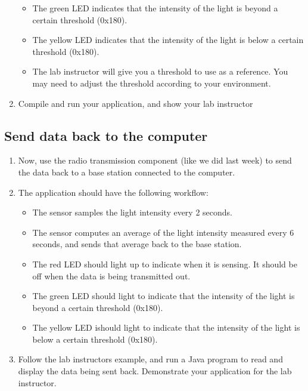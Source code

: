 \documentclass[letterpaper,12pt]{article}
\begin{document}
\begin{enumerate}
\begin{itemize}
            \item The green LED indicates that the intensity of the light
                  is beyond a certain threshold (0x180).
            \item The yellow LED indicates that the intensity of the light is
                  below a certain threshold (0x180).
            \item The lab instructor will give you a threshold to use as a
                  reference. You may need to adjust the threshold according
                  to your environment.
          \end{itemize}
    \item Compile and run your application, and show your lab instructor
\end{enumerate}
\subsection*{Send data back to the computer}
\begin{enumerate}
    \item Now, use the radio transmission component (like we did last week) to
          send the data back to a base station connected to the computer.
    \item The application should have the following workflow:
        \begin{itemize}
            \item The sensor samples the light intensity every 2 seconds.
            \item The sensor computes an average of the light intensity
                  measured every 6 seconds, and sends that average back
                  to the base station.
            \item The red LED should light up to indicate when it is sensing.
                  It should be off when the data is being transmitted out.
            \item The green LED should light to indicate that the intensity of
                  the light is beyond a certain threshold (0x180).
            \item The yellow LED ishould light to indicate that the intensity
                  of the light is below a certain threshold (0x180).
        \end{itemize}
    \item Follow the lab instructors example, and run a Java program to read
          and display the data being sent back. Demonstrate your application for
          the lab instructor.
\end{enumerate}
\end{document}
